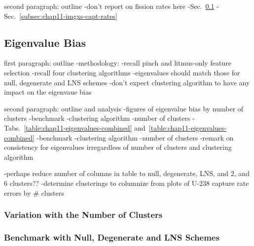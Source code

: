 second paragraph: outline
-don't report on fission rates here
-Sec.~\ref{subsec:chap11-imgxs-eigenvalue-bias}
-Sec.~\ref{subsec:chap11-imgxs-capt-rates}

\subsection{Eigenvalue Bias}
\label{subsec:chap11-imgxs-eigenvalue-bias}

first paragraph: outline
-methodology:
  -recall pinch and litmus-only feature selection
  -recall four clustering algorithms
-eigenvalues should match those for null, degenerate and LNS schemes
  -don't expect clustering algorithm to have any impact on the eigenvaue bias

second paragraph: outline and analysis
-figures of eigenvalue bias by number of clusters
  -benchmark
  -clustering algorithm
  -number of clusters
-Tabs.~\ref{table:chap11-eigenvalues-combined} and~\ref{table:chap11-eigenvalues-combined}
  -benchmark
  -clustering algorithm
  -number of clusters
-remark on consistency for eigenvalues irregardless of number of clusters and clustering algorithm

-perhaps reduce number of columns in table to null, degenerate, LNS, and 2, and 6 clusters??
  -determine clusterings to columnize from plots of U-238 capture rate errors by \# clusters

\subsubsection{Variation with the Number of Clusters}
\label{subsec:chap11-imgxs-eigenvalues-num-clusters}

\subsubsection{Benchmark with Null, Degenerate and LNS Schemes}
\label{subsec:chap11-imgxs-eigenvalues-benchmar}

